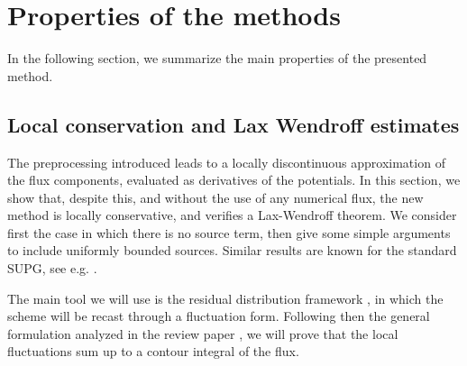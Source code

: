 \documentclass[a4paper,10pt]{article}
\begin{document}
\section{Properties  of the  methods}\label{sec:properties}
In the following section, we summarize the main properties of the presented method.

\subsection{Local conservation and Lax Wendroff estimates}\label{sec:local_conservation}

The   preprocessing introduced leads to a locally discontinuous approximation of the flux components, evaluated as derivatives of the potentials.
 In this section, we   show that, despite this, and without the use of any numerical flux, the new method 
 is locally conservative, and  verifies  a Lax-Wendroff theorem. 
We consider first  the case in which there is no source term, then give some simple arguments to include   uniformly bounded sources. 
Similar results are known for the standard SUPG, see    e.g.   \cite{AR:17,Abgrall2022,amr2025}. 




The main tool we will use is the residual distribution framework \cite{AR:17}, in which the scheme will be recast through a fluctuation form. Following  then the   general formulation analyzed in the review paper \cite{amr2025},
we will prove that the local fluctuations sum up to a contour integral of the flux. 
\end{document}
